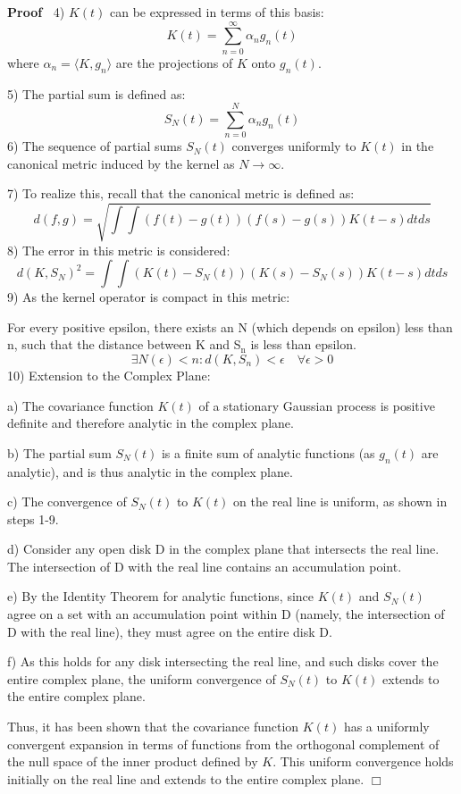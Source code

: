 \documentclass{article}
\newcommand{\tmrsub}[1]{\ensuremath{_{\textrm{#1}}}}
\newenvironment{proof}{\noindent\textbf{Proof\ }}{\hspace*{\fill}$\Box$\medskip}
\begin{document}
\begin{proof}
  4) $K (t)$ can be expressed in terms of this basis:
  \begin{equation}
    K (t) = \sum_{n = 0}^{\infty} \alpha_n g_n (t)
  \end{equation}
  where $\alpha_n = \langle K, g_n \rangle$ are the projections of $K$ onto
  $g_n (t)$.
  
  5) The partial sum is defined as:
  \begin{equation}
    S_N (t) = \sum_{n = 0}^N \alpha_n g_n (t)
  \end{equation}
  6) The sequence of partial sums $S_N (t)$ converges uniformly to $K (t)$ in
  the canonical metric induced by the kernel as $N \to \infty$.
  
  7) To realize this, recall that the canonical metric is defined as:
  \begin{equation}
    d (f, g) = \sqrt{\int \int (f (t) - g (t))  (f (s) - g (s)) K (t - s)
    dtds}
  \end{equation}
  8) The error in this metric is considered:
  \begin{equation}
    d (K, S_N)^2 = \int \int (K (t) - S_N (t))  (K (s) - S_N (s)) K (t - s)
    dtds
  \end{equation}
  9) As the kernel operator is compact in this metric:
  
  For every positive epsilon, there exists an N (which depends on epsilon)
  less than n, such that the distance between K and S\tmrsub{n} is less than
  epsilon.
  \begin{equation}
    \exists N (\epsilon) < n : d (K, S_n) < \epsilon \quad \forall \epsilon >
    0
  \end{equation}
  10) Extension to the Complex Plane:
  
  a) The covariance function $K (t)$ of a stationary Gaussian process is
  positive definite and therefore analytic in the complex plane.
  
  b) The partial sum $S_N (t)$ is a finite sum of analytic functions (as $g_n
  (t)$ are analytic), and is thus analytic in the complex plane.
  
  c) The convergence of $S_N (t)$ to $K (t)$ on the real line is uniform, as
  shown in steps 1-9.
  
  d) Consider any open disk D in the complex plane that intersects the real
  line. The intersection of D with the real line contains an accumulation
  point.
  
  e) By the Identity Theorem for analytic functions, since $K (t)$ and $S_N
  (t)$ agree on a set with an accumulation point within D (namely, the
  intersection of D with the real line), they must agree on the entire disk D.
  
  f) As this holds for any disk intersecting the real line, and such disks
  cover the entire complex plane, the uniform convergence of $S_N (t)$ to $K
  (t)$ extends to the entire complex plane.
  
  Thus, it has been shown that the covariance function $K (t)$ has a uniformly
  convergent expansion in terms of functions from the orthogonal complement of
  the null space of the inner product defined by $K$. This uniform convergence
  holds initially on the real line and extends to the entire complex plane.
\end{proof}
\end{document}
